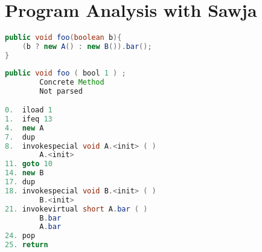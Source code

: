 \section{Program Analysis with Sawja}

\begin{lstlisting}[caption=Java sample.,language=Java]
public void foo(boolean b){
    (b ? new A() : new B()).bar();
}
\end{lstlisting}

\begin{lstlisting}[caption=Sawja sample.,language=Java]
public void foo ( bool 1 ) ;
		Concrete Method
    	Not parsed

0.  iload 1
1.  ifeq 13
4.  new A
7.  dup
8.  invokespecial void A.<init> ( )
        A.<init>
11. goto 10
14. new B
17. dup
18. invokespecial void B.<init> ( )
        B.<init>
21. invokevirtual short A.bar ( )
        B.bar
        A.bar
24. pop
25. return

\end{lstlisting}